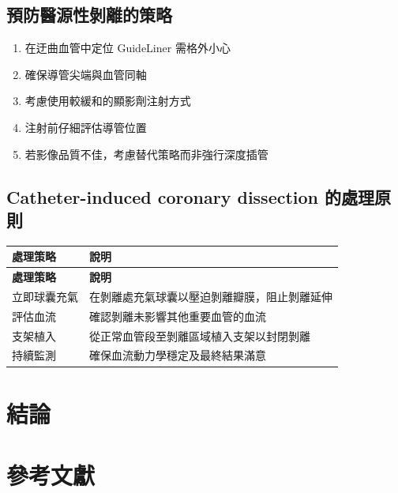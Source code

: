 \documentclass[12pt,a4paper]{article}
\begin{document}
\subsection{預防醫源性剝離的策略}

\begin{enumerate}
    \item 在迂曲血管中定位 GuideLiner 需格外小心
    \item 確保導管尖端與血管同軸
    \item 考慮使用較緩和的顯影劑注射方式
    \item 注射前仔細評估導管位置
    \item 若影像品質不佳，考慮替代策略而非強行深度插管
\end{enumerate}

\subsection{Catheter-induced coronary dissection 的處理原則}

\begin{longtable}{p{4cm}p{10cm}}
\toprule
\textbf{處理策略} & \textbf{說明} \\
\midrule
\endfirsthead
\toprule
\textbf{處理策略} & \textbf{說明} \\
\midrule
\endhead
立即球囊充氣 & 在剝離處充氣球囊以壓迫剝離瓣膜，阻止剝離延伸 \\
\midrule
評估血流 & 確認剝離未影響其他重要血管的血流 \\
\midrule
支架植入 & 從正常血管段至剝離區域植入支架以封閉剝離 \\
\midrule
持續監測 & 確保血流動力學穩定及最終結果滿意 \\
\bottomrule
\end{longtable}

\section{結論}


\section{參考文獻}
\end{document}

